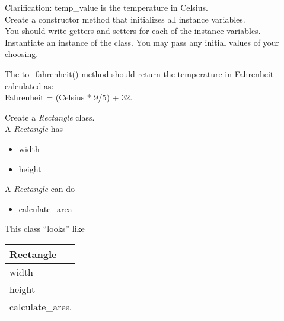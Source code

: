 \documentclass{article}
\newcommand{\tab}{\hspace*{0.25in}}
\begin{document}
\begin{enumerate}
	\vspace*{2ex}
	Clarification: temp\_value is the temperature in Celsius.\\
	Create a constructor method that initializes all instance variables.\\
	You should write getters and setters for each of the instance variables.\\
	Instantiate an instance of the class. You may pass any initial values of your choosing.
	
	The to\_fahrenheit() method should return the temperature in Fahrenheit calculated as:\\
	Fahrenheit = (Celsius * 9/5) + 32.\




	\begin{minipage}{.6\textwidth}
	\item Create a \textit{Rectangle} class.\\
		A \textit{Rectangle} has
		\begin{itemize}
			\item width 
			\item height
		\end{itemize}

		A \textit{Rectangle} can do
		\begin{itemize}
			\item calculate\_area
		\end{itemize}
	\end{minipage}
	\begin{minipage}{.4\textwidth}
		This class ``looks'' like 
				
		\vspace*{1em}
		\begin{tabular}{|l|}
			\hline Rectangle\\ \hline
			width\\ height \\  \hline
			calculate\_area\\ \hline
		\end{tabular}
	\end{minipage}



\end{enumerate}
\end{document}
